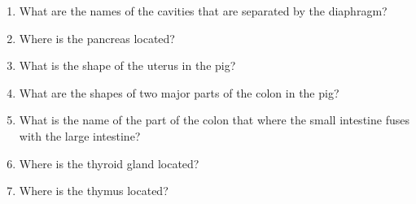 \begin{enumerate}
\def\labelenumi{\arabic{enumi}.}
\tightlist
\item
  What are the names of the cavities that are separated by the diaphragm?
\item
  Where is the pancreas located?
\item
  What is the shape of the uterus in the pig?
\item
  What are the shapes of two major parts of the colon in the pig?
\item
  What is the name of the part of the colon that where the small intestine fuses with the large intestine?
\item
  Where is the thyroid gland located?
\item
  Where is the thymus located?
\end{enumerate}
